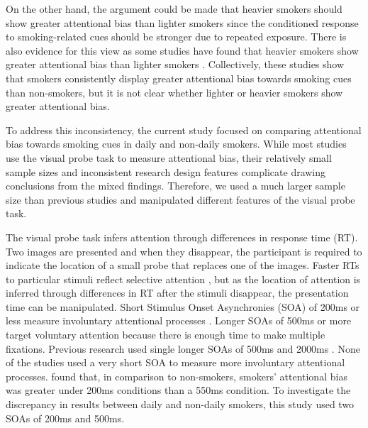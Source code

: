 \documentclass[empirical, authordate, issue]{jote-new-article}
\begin{document}
On the other hand, the argument could be made that heavier smokers should show greater attentional bias than lighter smokers since the conditioned response to smoking-related cues should be stronger due to repeated exposure. There is also evidence for this view as some studies have found that heavier smokers show greater attentional bias than lighter smokers \parencite{Chanon2010, Vollstädt-Klein2011, Zack2001}. Collectively, these studies show that smokers consistently display greater attentional bias towards smoking cues than non-smokers, but it is not clear whether lighter or heavier smokers show greater attentional bias.

To address this inconsistency, the current study focused on comparing attentional bias towards smoking cues in daily and non-daily smokers. While most studies use the visual probe task to measure attentional bias, their relatively small sample sizes and inconsistent research design features complicate drawing conclusions from the mixed findings. Therefore, we used a much larger sample size than previous studies and manipulated different features of the visual probe task.

The visual probe task infers attention through differences in response time (RT). Two images are presented and when they disappear, the participant is required to indicate the location of a small probe that replaces one of the images. Faster RTs to particular stimuli reflect selective attention \parencite{Field2008}, but as the location of attention is inferred through differences in RT after the stimuli disappear, the presentation time can be manipulated. Short Stimulus Onset Asynchronies (SOA) of 200ms or less measure involuntary attentional processes \parencite{Field2008}. Longer SOAs of 500ms or more target voluntary attention because there is enough time to make multiple fixations. Previous research used single longer SOAs of 500ms \parencite{Vollstädt-Klein2011} and 2000ms \parencite{Hogarth2003, Mogg2005}. None of the studies used a very short SOA to measure more involuntary attentional processes. \textcite{Chanon2010} found that, in comparison to non-smokers, smokers' attentional bias was greater under 200ms conditions than a 550ms condition. To investigate the discrepancy in results between daily and non-daily smokers, this study used two SOAs of 200ms and 500ms.
\end{document}
